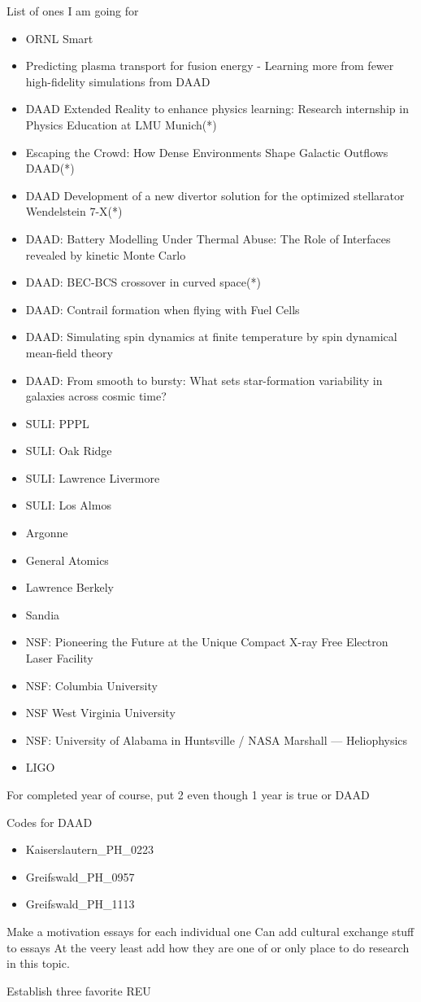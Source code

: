 List of ones I am going for
\begin{itemize}
  \item ORNL Smart
  \item Predicting plasma transport for fusion energy - Learning more from fewer high-fidelity simulations from DAAD
  \item DAAD Extended Reality to enhance physics learning: Research internship in Physics Education at LMU Munich(*)
  \item Escaping the Crowd: How Dense Environments Shape Galactic Outflows DAAD(*)
  \item DAAD Development of a new divertor solution for the optimized stellarator Wendelstein 7-X(*)
  \item DAAD: Battery Modelling Under Thermal Abuse: The Role of Interfaces revealed by kinetic Monte Carlo
  \item DAAD: BEC-BCS crossover in curved space(*)
  \item DAAD: Contrail formation when flying with Fuel Cells
  \item DAAD: Simulating spin dynamics at finite temperature by spin dynamical mean-field theory
  \item DAAD: From smooth to bursty: What sets star-formation variability in galaxies across cosmic time?
  \item SULI: PPPL
  \item SULI: Oak Ridge
  \item SULI: Lawrence Livermore
  \item SULI: Los Almos
  \item Argonne
  \item General Atomics
  \item Lawrence Berkely
  \item Sandia
  \item NSF: Pioneering the Future at the Unique Compact X-ray Free Electron Laser Facility
  \item NSF: Columbia University
  \item NSF West Virginia University
  \item NSF: University of Alabama in Huntsville / NASA Marshall — Heliophysics
  \item LIGO
\end{itemize}

For completed year of course, put 2 even though 1 year is true or DAAD



Codes for DAAD
\begin{itemize}
  \item Kaiserslautern_PH_0223
  \item Greifswald_PH_0957
  \item Greifswald_PH_1113
\end{itemize}
Make a motivation essays for each individual one
Can add cultural exchange stuff to essays
At the veery least add how they are one of or only place to do research in this topic.

Establish three favorite REU
